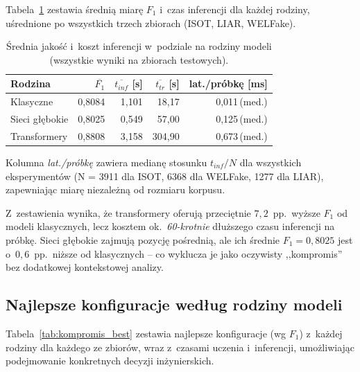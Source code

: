 \documentclass[oneside,polski,logo]{amuthesis}
\begin{document}
Tabela~\ref{tab:kompromis_srednie} zestawia średnią miarę $F_1$
i~czas inferencji dla każdej rodziny, uśrednione po wszystkich
trzech zbiorach (ISOT, LIAR, WELFake).

\begin{table}[ht]
\centering
\caption{Średnia jakość i~koszt inferencji w~podziale na rodziny
modeli (wszystkie wyniki na zbiorach testowych).}
\label{tab:kompromis_srednie}
\begin{tabular}{lrrrr}
\toprule
Rodzina & $\overline{F_1}$ & $\overline{t_{inf}}$ [s] & $\overline{t_{tr}}$ [s] & lat./próbkę [ms] \\
\midrule
Klasyczne    & 0,8084 & 1,101 & 18,17  & 0,011\,(med.) \\
Sieci głębokie & 0,8025 & 0,549 & 57,00  & 0,125\,(med.) \\
Transformery & 0,8808 & 3,158 & 304,90 & 0,673\,(med.) \\
\bottomrule
\end{tabular}
\end{table}

Kolumna \emph{lat./próbkę} zawiera medianę stosunku $t_{inf}/N$
dla wszystkich eksperymentów (N = 3911 dla ISOT, 6368 dla WELFake,
1277 dla LIAR), zapewniając miarę niezależną od rozmiaru korpusu.

Z~zestawienia wynika, że transformery oferują przeciętnie
\(7{,}2\)~pp.\ wyższe $F_1$ od modeli klasycznych, lecz kosztem
ok.\ \emph{60-krotnie} dłuższego czasu inferencji na próbkę. Sieci
głębokie zajmują pozycję pośrednią, ale ich średnie \(F_1 = 0{,}8025\)
jest o~\(0{,}6\)~pp.\ niższe od klasycznych -- co wyklucza je jako
oczywisty ,,kompromis'' bez dodatkowej kontekstowej analizy.

\subsection{Najlepsze konfiguracje według rodziny modeli}
\label{sec:kompromis_best}

Tabela~\ref{tab:kompromis_best} zestawia najlepsze konfiguracje
(wg $F_1$) z~każdej rodziny dla każdego ze zbiorów, wraz
z~czasami uczenia i~inferencji, umożliwiając podejmowanie
konkretnych decyzji inżynierskich.
\end{document}
